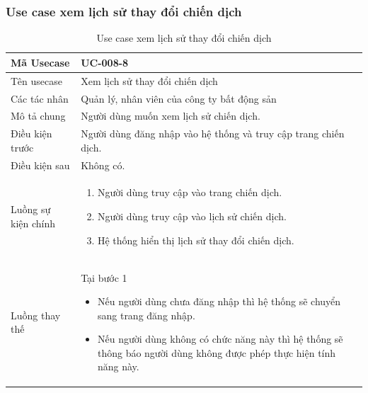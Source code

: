 \documentclass[12pt,a4paper]{article}
\begin{document}
    \subsubsection*{Use case xem lịch sử thay đổi chiến dịch}
    \begin{table}[H]
        \centering
        \begin{tabular}{|p{3.5cm}|p{11.5cm}|c|}
            \hline
            Mã Usecase      & UC-008-8                                                        \\
            \hline
            Tên usecase     & Xem lịch sử thay đổi chiến dịch                                 \\
            \hline
            Các tác nhân    & Quản lý, nhân viên của công ty bất động sản                     \\
            \hline
            Mô tả chung     & Người dùng muốn xem lịch sử chiến dịch.                         \\
            \hline

            Điều kiện trước & Người dùng đăng nhập vào hệ thống và truy cập trang chiến dịch. \\
            \hline

            Điều kiện sau   & Không có.                                                       \\
            \hline

            Luồng sự kiện chính & \vspace{-.8cm}\begin{enumerate}
                                                    \item Người dùng truy cập vào trang chiến dịch.
                                                    \item Người dùng truy cập vào lịch sử chiến dịch.
                                                    \item Hệ thống hiển thị lịch sử thay đổi chiến dịch.
            \end{enumerate}
            \\
            \hline
            Luồng thay thế & Tại bước 1\newline
            \vspace{-.8cm}\begin{itemize}
                              \item Nếu người dùng chưa đăng nhập thì hệ thống sẽ chuyển sang trang đăng nhập.
                              \item Nếu người dùng không có chức năng này thì hệ thống sẽ thông báo người dùng không được phép thực hiện tính năng này.
            \end{itemize}
            \\ \hline
        \end{tabular}
        \caption{Use case xem lịch sử thay đổi chiến dịch}

    \end{table}
\end{document}
